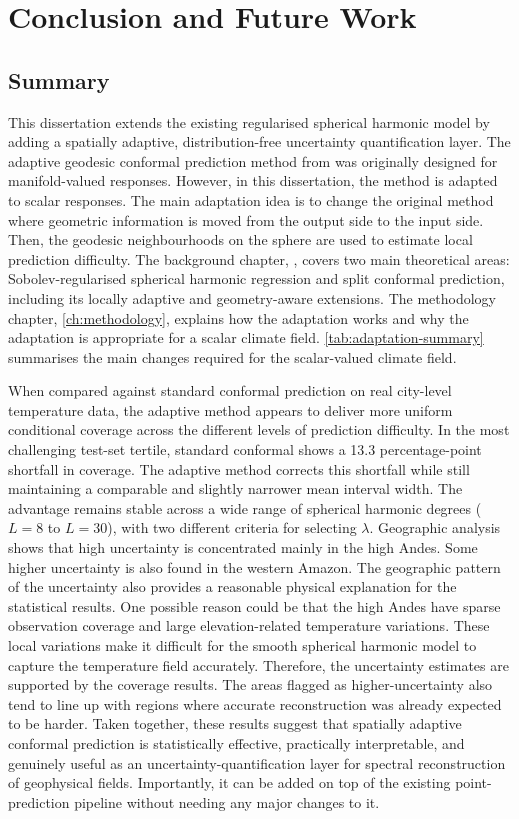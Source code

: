 \chapter{Conclusion and Future Work}
\label{ch:conclusion}

\section{Summary}

This dissertation extends the existing regularised spherical harmonic model by adding a spatially adaptive, distribution-free uncertainty quantification layer. 
The adaptive geodesic conformal prediction method from  \citet{amirishahbazi2026}  was originally designed for manifold-valued responses. However, in this dissertation, the method is adapted to scalar responses. The main adaptation idea is to change the original method where geometric information is moved from the output side to the input side. Then, the geodesic neighbourhoods on the sphere are used to estimate local prediction difficulty. The background chapter, , covers two main theoretical areas: Sobolev-regularised spherical harmonic regression and split conformal prediction, including its locally adaptive and geometry-aware extensions. The methodology chapter, \cref{ch:methodology}, explains how the adaptation works and why the adaptation is appropriate for a scalar climate field. \cref{tab:adaptation-summary} summarises the main changes required for the scalar-valued climate field. 

When compared against standard conformal prediction on real city-level temperature data, the adaptive method appears to deliver more uniform conditional coverage across the different levels of prediction difficulty. In the most challenging test-set tertile, standard conformal shows a 13.3 percentage-point shortfall in coverage. The adaptive method corrects this shortfall while still maintaining a comparable and slightly narrower mean interval width. The advantage remains stable across a wide range of spherical harmonic degrees ($L=8$ to $L=30$), with two different criteria for selecting $\lambda$. Geographic analysis shows that high uncertainty is concentrated mainly in the high Andes. Some higher uncertainty is also found in the western Amazon. The geographic pattern of the uncertainty also provides a reasonable physical explanation for the statistical results. One possible reason could be that the high Andes have sparse observation coverage and large elevation-related temperature variations. These local variations make it difficult for the smooth spherical harmonic model to capture the temperature field accurately. Therefore, the uncertainty estimates are supported by the coverage results. The areas flagged as higher-uncertainty also tend to line up with regions where accurate reconstruction was already expected to be harder. Taken together, these results suggest that spatially adaptive conformal prediction is statistically effective, practically interpretable, and genuinely useful as an uncertainty-quantification layer for spectral reconstruction of geophysical fields. Importantly, it can be added on top of the existing point-prediction pipeline without needing any major changes to it.
 
